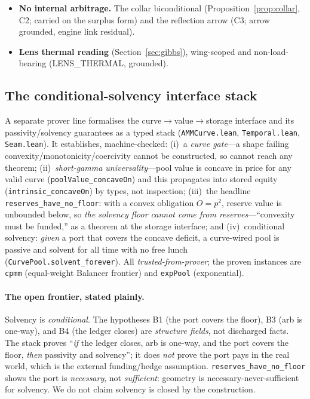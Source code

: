 \documentclass[11pt]{article}
\newcommand{\tfp}{\emph{trusted-from-prover}}
\begin{document}
\begin{itemize}[leftmargin=2em]
        $m=1\Leftrightarrow$ plain Balancer, the round-trip trade map, and the
        linear warp $\int m=m\,\Delta\gamma$ (constant-$m$ \texttt{g\_eq\_m\_gamma},
        \texttt{g\_const\_in\_strike}, \texttt{g\_eq\_gamma\_iff\_m\_one},
        \texttt{thetaTx\_roundtrip}, \texttt{warp\_linear}, all grounded).
  \item \textbf{No internal arbitrage.} The collar biconditional
        (Proposition~\ref{prop:collar}, C2; carried on the surplus form) and the
        reflection arrow (C3; arrow grounded, engine link residual).
  \item \textbf{Lens thermal reading} (Section~\ref{sec:gibbs}), wing-scoped and
        non-load-bearing (LENS\_THERMAL, grounded).
\end{itemize}

\subsection{The conditional-solvency interface stack}
A separate prover line formalises the curve$\to$value$\to$storage interface and
its passivity/solvency guarantees as a typed stack (\texttt{AMMCurve.lean},
\texttt{Temporal.lean}, \texttt{Seam.lean}). It establishes, machine-checked:
(i)~a \emph{curve gate}---a shape failing convexity/monotonicity/coercivity
cannot be constructed, so cannot reach any theorem; (ii)~\emph{short-gamma
universality}---pool value is concave in price for any valid curve
(\texttt{poolValue\_concaveOn}) and this propagates into stored equity
(\texttt{intrinsic\_concaveOn}) by types, not inspection; (iii)~the headline
\texttt{reserves\_have\_no\_floor}: with a convex obligation $O=p^{2}$, reserve
value is unbounded below, so \emph{the solvency floor cannot come from
reserves}---``convexity must be funded,'' as a theorem at the storage interface;
and (iv)~conditional solvency: \emph{given} a port that covers the concave
deficit, a curve-wired pool is passive and solvent for all time with no free lunch
(\texttt{CurvePool.solvent\_forever}). All \tfp{}; the proven instances are
\texttt{cpmm} (equal-weight Balancer frontier) and \texttt{expPool}
(exponential).

\paragraph{The open frontier, stated plainly.}
Solvency is \emph{conditional}. The hypotheses B1 (the port covers the floor), B3
(arb is one-way), and B4 (the ledger closes) are \emph{structure fields}, not
discharged facts. The stack proves ``\emph{if} the ledger closes, arb is one-way,
and the port covers the floor, \emph{then} passivity and solvency''; it does
\emph{not} prove the port pays in the real world, which is the external
funding/hedge assumption. \texttt{reserves\_have\_no\_floor} shows the port is
\emph{necessary}, not \emph{sufficient}: geometry is necessary-never-sufficient for
solvency. We do not claim solvency is closed by the construction.
\end{document}
